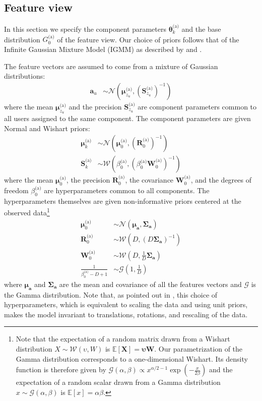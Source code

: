 \documentclass[smallextended]{svjour3}          %
\newcommand{\Muo}{\boldsymbol{\mu}_{0}^\text{(a)}}
\newcommand{\Ro}{\mathbf{R}_{0}^\text{(a)}}
\newcommand{\invRo}{\left(\mathbf{R}_{0}^\text{(a)}\right)^{-1}}
\newcommand{\Wo}{\mathbf{W}_{0}^\text{(a)}}
\newcommand{\betaoa}{\beta_{0}^\text{(a)}}
\newcommand{\Muk}{\boldsymbol{\mu}_{k}^\text{(a)}}
\newcommand{\Sk}{\mathbf{S}_{k}^\text{(a)}}
\newcommand{\Szu}{\mathbf{S}_{z_u}^\text{(a)}}
\newcommand{\invSzu}{\left(\mathbf{S}_{z_u}^{\text{(a)}}\right)^{-1}}
\newcommand{\Muzu}{\boldsymbol{\mu}_{z_u}^\text{(a)}}
\begin{document}
\subsection{Feature view}\label{sec:forums_features}
In this section we specify the component parameters $\boldsymbol{\theta}_k^{\text{(a)}}$ and the base distribution $G_0^{\text{(a)}}$ of the feature view. Our choice of priors follows that of the Infinite Gaussian Mixture Model (IGMM) as described by  \cite{Rasmussen2000a} and  \cite{Gorur2010}.

The feature vectors are assumed to come from a mixture of Gaussian distributions: 
\begin{align}
\boldsymbol{a}_u &\sim \mathcal{N}\left(\Muzu, \invSzu\right)
\end{align}
where the mean $\Muzu$ and the precision $\Szu$ are component parameters common to all users assigned to the same component. The component parameters are given Normal and Wishart priors: 
\begin{align}
\Muk &\sim  \mathcal{N}\left(\Muo, \invRo\right)\\
\Sk &\sim  \mathcal{W}\left( \betaoa, \left( \betaoa \Wo \right)^{-1}\right) 
\label{eq:wishart_sar}
\end{align}
where the mean $\Muo$, the precision $\Ro$, the covariance $\Wo$, and the degrees of freedom $\betaoa$ are hyperparameters common to all components. The hyperparameters themselves are given non-informative priors centered at the observed data{\footnote{Note that the expectation of a random matrix drawn from a Wishart distribution $X \sim \mathcal{W}(\upsilon, W)$ is $\mathbb{E}[\mathbf{X}] = \mathbf{\upsilon W}$. Our parametrization of the Gamma distribution corresponds to a one-dimensional Wishart. Its density function is therefore given by $\mathcal{G}(\alpha, \beta) \propto
x^{\alpha/2-1} \exp(-\frac{x}{2\beta})$
and the expectation of a random scalar drawn from a Gamma distribution $x \sim \mathcal{G}(\alpha, \beta)$ is $\mathbb{E}[x] = \alpha\beta$.}}
\begin{align}
\Muo &\sim \mathcal{N}(\boldsymbol{\mu_a, \Sigma_a}) \\
\Ro &\sim \mathcal{W}(D, (D \boldsymbol{\Sigma_a})^{-1})\\
\Wo &\sim \mathcal{W}(D, \frac{1}{D} \boldsymbol{\Sigma_a})\\
\frac{1}{\betaoa - D + 1} &\sim \mathcal{G}(1, \frac{1}{D}) \label{eq:gamma_ba0}
\end{align}
where $\boldsymbol{\mu_a}$ and $\boldsymbol{\Sigma_a}$ are the mean and covariance of all the features vectors and $\mathcal{G}$ is the Gamma distribution. Note that, as pointed out in \cite{Gorur2010}, this choice of hyperparameters, which is equivalent to scaling the data and using unit priors, makes the model invariant to translations, rotations, and rescaling of the data. 
\end{document}
